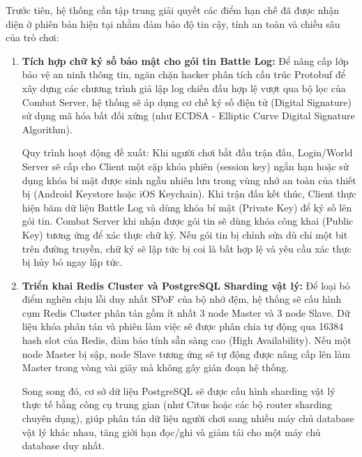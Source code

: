 \documentclass[../Project.tex]{subfiles}
\begin{document}
Trước tiên, hệ thống cần tập trung giải quyết các điểm hạn chế đã được nhận diện ở phiên bản hiện tại nhằm đảm bảo độ tin cậy, tính an toàn và chiều sâu của trò chơi:
\begin{enumerate}
    \item \textbf{Tích hợp chữ ký số bảo mật cho gói tin Battle Log:} 
    Để nâng cấp lớp bảo vệ an ninh thông tin, ngăn chặn hacker phân tích cấu trúc Protobuf để xây dựng các chương trình giả lập log chiến đấu hợp lệ vượt qua bộ lọc của Combat Server, hệ thống sẽ áp dụng cơ chế ký số điện tử (Digital Signature) sử dụng mã hóa bất đối xứng (như ECDSA - Elliptic Curve Digital Signature Algorithm).
    
    Quy trình hoạt động đề xuất: Khi người chơi bắt đầu trận đấu, Login/World Server sẽ cấp cho Client một cặp khóa phiên (session key) ngắn hạn hoặc sử dụng khóa bí mật được sinh ngẫu nhiên lưu trong vùng nhớ an toàn của thiết bị (Android Keystore hoặc iOS Keychain). Khi trận đấu kết thúc, Client thực hiện băm dữ liệu Battle Log và dùng khóa bí mật (Private Key) để ký số lên gói tin. Combat Server khi nhận được gói tin sẽ dùng khóa công khai (Public Key) tương ứng để xác thực chữ ký. Nếu gói tin bị chỉnh sửa dù chỉ một bit trên đường truyền, chữ ký sẽ lập tức bị coi là bất hợp lệ và yêu cầu xác thực bị hủy bỏ ngay lập tức.
    
    \item \textbf{Triển khai Redis Cluster và PostgreSQL Sharding vật lý:}
    Để loại bỏ điểm nghẽn chịu lỗi duy nhất SPoF của bộ nhớ đệm, hệ thống sẽ cấu hình cụm Redis Cluster phân tán gồm ít nhất 3 node Master và 3 node Slave. Dữ liệu khóa phân tán và phiên làm việc sẽ được phân chia tự động qua 16384 hash slot của Redis, đảm bảo tính sẵn sàng cao (High Availability). Nếu một node Master bị sập, node Slave tương ứng sẽ tự động được nâng cấp lên làm Master trong vòng vài giây mà không gây gián đoạn hệ thống.
    
    Song song đó, cơ sở dữ liệu PostgreSQL sẽ được cấu hình sharding vật lý thực tế bằng công cụ trung gian (như Citus hoặc các bộ router sharding chuyên dụng), giúp phân tán dữ liệu người chơi sang nhiều máy chủ database vật lý khác nhau, tăng giới hạn đọc/ghi và giảm tải cho một máy chủ database duy nhất.
    

\end{enumerate}
\end{document}
